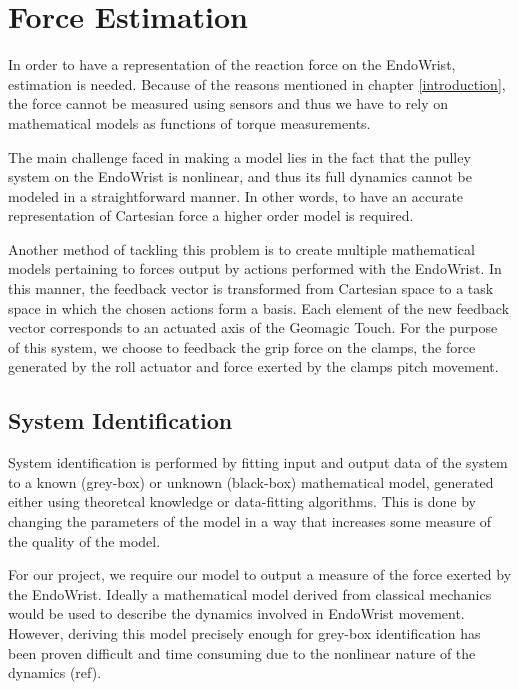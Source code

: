 \chapter{Force Estimation}
In order to have a representation of the reaction force on the EndoWrist, estimation is needed.
Because of the reasons mentioned in chapter \ref{introduction}, the force cannot be measured using sensors and thus we have to rely on mathematical models as functions of torque measurements.

The main challenge faced in making a model lies in the fact that the pulley system on the EndoWrist is nonlinear, and thus its full dynamics cannot be modeled in a straightforward manner. 
In other words, to have an accurate representation of Cartesian force a higher order model is required.

Another method of tackling this problem is to create multiple mathematical models pertaining to forces output by actions performed with the EndoWrist.
In this manner, the feedback vector is transformed from Cartesian space to a task space in which the chosen actions form a basis.
Each element of the new feedback vector corresponds to an actuated axis of the Geomagic Touch.
For the purpose of this system, we choose to feedback the grip force on the clamps, the force generated by the roll actuator and force exerted by the clamps pitch movement.

\section{System Identification}
System identification is performed by fitting input and output data of the system to a known (grey-box) or unknown (black-box) mathematical model, generated either using theoretcal knowledge or data-fitting algorithms. 
This is done by changing the parameters of the model in a way that increases some measure of the quality of the model.

For our project, we require our model to output a measure of the force exerted by the EndoWrist.
Ideally a mathematical model derived from classical mechanics would be used to describe the dynamics involved in EndoWrist movement.
However, deriving this model precisely enough for grey-box identification has been proven difficult and time consuming due to the nonlinear nature of the dynamics (ref).

